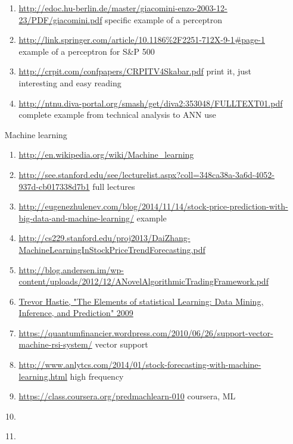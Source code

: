 \documentclass{article}
\begin{document}
\begin{enumerate}
\begin{enumerate}
			\item \textcolor{blue}{\url{http://edoc.hu-berlin.de/master/giacomini-enzo-2003-12-23/PDF/giacomini.pdf}} specific example of a perceptron
			\item \textcolor{blue}{\url{http://link.springer.com/article/10.1186\%2F2251-712X-9-1\#page-1}} example of a perceptron for S\&P 500
			\item \textcolor{red}{\url{http://crpit.com/confpapers/CRPITV4Skabar.pdf}} print it, just interesting and easy reading
			\item \textcolor{red}{\url{http://ntnu.diva-portal.org/smash/get/diva2:353048/FULLTEXT01.pdf}} complete example from technical analysis to ANN use
		\end{enumerate}
	\item[Machine learning]
		\begin{enumerate}
			\item \textcolor{black}{\url{http://en.wikipedia.org/wiki/Machine_learning}}
			\item \textcolor{black}{\url{http://see.stanford.edu/see/lecturelist.aspx?coll=348ca38a-3a6d-4052-937d-cb017338d7b1}} full lectures
			\item \textcolor{black}{\url{http://eugenezhulenev.com/blog/2014/11/14/stock-price-prediction-with-big-data-and-machine-learning/}} example
			\item \textcolor{black}{\url{http://cs229.stanford.edu/proj2013/DaiZhang-MachineLearningInStockPriceTrendForecasting.pdf}}
			\item \textcolor{black}{\url{http://blog.andersen.im/wp-content/uploads/2012/12/ANovelAlgorithmicTradingFramework.pdf}}
			\item \textcolor{black}{\url{Trevor Hastie, "The Elements of statistical Learning: Data Mining, Inference, and Prediction" 2009}}
			\item \textcolor{black}{\url{https://quantumfinancier.wordpress.com/2010/06/26/support-vector-machine-rsi-system/}} vector support
			\item \textcolor{black}{\url{http://www.anlytcs.com/2014/01/stock-forecasting-with-machine-learning.html}} high frequency
			\item \textcolor{black}{\url{https://class.coursera.org/predmachlearn-010}} coursera, ML
			\item \textcolor{black}{\url{}}
			\item \textcolor{black}{\url{}}
		\end{enumerate}
		

\end{enumerate}
\end{document}
